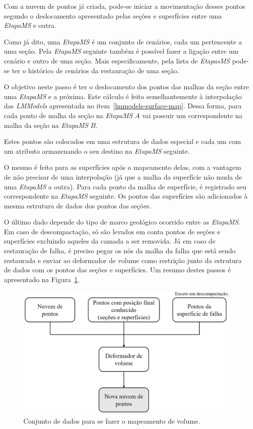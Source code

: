 Com a nuvem de pontos já criada, pode-se iniciar a movimentação desses pontos segundo o deslocamento apresentado pelas seções e superfícies entre uma \emph{EtapaMS} e outra. 

Como já dito, uma \emph{EtapaMS} é um conjunto de cenários, cada um pertencente a uma seção. Pela \emph{EtapaMS} seguinte também é possível fazer a ligação entre um cenário e outro de uma seção. Mais especificamente, pela lista de \emph{EtapasMS} pode-se ter o histórico de cenários da restauração de uma seção.

O objetivo neste passo é ter o deslocamento dos pontos das malhas da seção entre uma \emph{EtapaMS} e a próxima. Este cálculo é feito semelhantemente à interpolação das \emph{LMModels} apresentada no item~\ref{lmmodels-surface-map}. Dessa forma, para cada ponto de malha da seção na \emph{EtapaMS} $A$ vai possuir um correspondente na malha da seção na \emph{EtapaMS} $B$.

Estes pontos são colocados em uma estrutura de dados especial e cada um com um atributo armazenando o seu destino na \emph{EtapaMS} seguinte.

O mesmo é feito para as superfícies após o mapeamento delas, com a vantagem de não precisar de uma interpolação (já que a malha da superfície não muda de uma \emph{EtapaMS} a outra). Para cada ponto da malha de superfície, é registrado seu correspondente na \emph{EtapaMS} seguinte. Os pontos das superfícies são adicionados à mesma estrutura de dados dos pontos das seções.

O último dado depende do tipo de marco geológico ocorrido entre as \emph{EtapaMS}. Em caso de descompactação, só são levados em conta pontos de seções e superfícies excluindo aqueles da camada a ser removida. Já em caso de restauração de falha, é preciso pegar os nós da malha da falha que está sendo restaurada e enviar ao deformador de volume como restrição junto da estrutura de dados com os pontos das seções e superfícies. Um resumo destes passos é apresentado na Figura~\ref{fig-vol-algorithm}.

\begin{figure} [H]
  \begin{center}
    \includegraphics[width=350pt]{images/fig-vol-algorithm}
    \caption{Conjunto de dados para se fazer o mapeamento de volume.}\label{fig-vol-algorithm}
  \end{center}
\end{figure}

